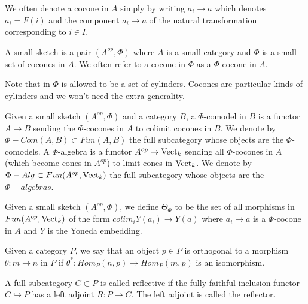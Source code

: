 We often denote a cocone in $A$ simply by writing $a_i\to a$ which denotes
$a_i=F(i)$ and the component $a_i\to a$ of the natural transformation
corresponding to $i\in I$.


\begin{definition}

  \noindent A small sketch is a pair $(A^{op},\Phi)$ where $A$ is a small
  category and $\Phi$ is a small set of cocones in $A$. We often refer to a
  cocone in $\Phi$ as a $\Phi$-cocone in $A$.
\end{definition}

\begin{remark}
  Note that in \cite{kelly/basic-concepts-enriched} $\Phi$ is allowed to be a
  set of cylinders. Cocones are particular kinds of cylinders and we won't
  need the extra generality.
\end{remark}

\begin{definition}
  \noindent Given a small sketch $(A^{op},\Phi)$ and a category $B$, a
  $\Phi$-comodel in $B$ is a functor $A\to B$ sending the $\Phi$-cocones in
  $A$ to colimit cocones in $B$. We denote by $\Phi-Com(A,B)\subset Fun(A,B)$
  the full subcategory whose objects are the $\Phi$-comodels. A $\Phi$-algebra
  is a functor $A^{op}\to \operatorname{Vect}_k$ sending all $\Phi$-cocones in $A$ (which
  become cones in $A^{op}$) to limit cones in $\operatorname{Vect}_k$. We denote by
  $\Phi-Alg\subset Fun(A^{op},\operatorname{Vect}_k)$ the full subcategory whose objects are
  the $\Phi-algebras$.
\end{definition}


\begin{definition}

  \noindent Given a small sketch $(A^{op},\Phi)$, we define $\Theta_{\Phi}$ to
  be the set of all morphisms in $Fun(A^{op},\operatorname{Vect}_k)$ of the form $colim_i
  Y(a_i)\to Y(a)$ where $a_i\to a$ is a $\Phi$-cocone in $A$ and $Y$ is the
  Yoneda embedding.
\end{definition}

\begin{definition}

  \noindent Given a category $P$, we say that an object $p\in P$ is orthogonal
  to a morphism $\theta:m\to n$ in $P$ if $\theta^*:Hom_P(n,p)\to Hom_P(m,p)$
  is an isomorphism.
\end{definition}

\begin{definition}
  \noindent A full subcategory $C\subset P$ is called reflective if the fully
  faithful inclusion functor $C\hookrightarrow P$ has a left adjoint $R:P\to
  C$. The left adjoint is called the reflector.
\end{definition}

